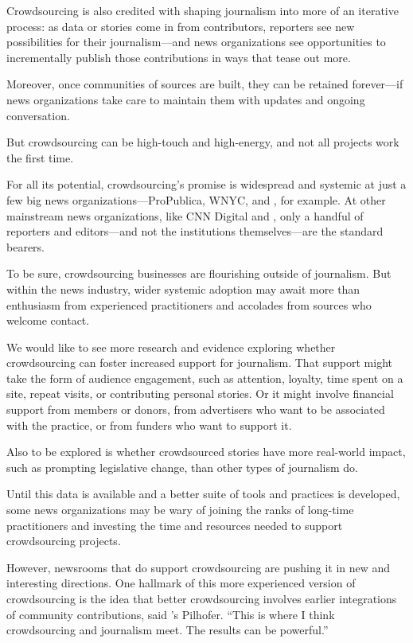 \begin{itemize}
\begin{itemize}
\begin{enumerate}
{Crowdsourcing is also credited with shaping journalism into more of an iterative process: as data or stories come in from contributors, reporters see new possibilities for their journalism---and news organizations see opportunities to incrementally publish those contributions in ways that tease out more. 

Moreover, once communities of sources are built, they can be retained forever---if news organizations take care to maintain them with updates and ongoing conversation.

But crowdsourcing can be high-touch and high-energy, and not all projects work the first time. 

For all its potential, crowdsourcing’s promise is widespread and systemic at just a few big news organizations---ProPublica, WNYC, and , for example. At other mainstream news organizations, like CNN Digital and , only a handful of reporters and editors---and not the institutions themselves---are the standard bearers. 

To be sure, crowdsourcing businesses are flourishing outside of journalism. But within the news industry, wider systemic adoption may await more than enthusiasm from experienced practitioners and accolades from sources who welcome contact.  

We would like to see more research and evidence exploring whether crowdsourcing can foster increased support for journalism. That support might take the form of audience engagement, such as attention, loyalty, time spent on a site, repeat visits, or contributing personal stories. Or it might involve financial support from members or donors, from advertisers who want to be associated with the practice, or from funders who want to support it. 

Also to be explored is whether crowdsourced stories have more real-world impact, such as prompting legislative change, than other types of journalism do. 

Until this data is available and a better suite of tools and practices is developed, some news organizations may be wary of joining the ranks of long-time practitioners and investing the time and resources needed to support crowdsourcing projects.

However, newsrooms that do support crowdsourcing are pushing it in new and interesting directions. One hallmark of this more experienced version of crowdsourcing is the idea that better crowdsourcing involves earlier integrations of community contributions, said ’s Pilhofer. “This is where I think crowdsourcing and journalism meet. The results can be powerful.” 


}
\end{enumerate}
\end{itemize}
\end{itemize}
